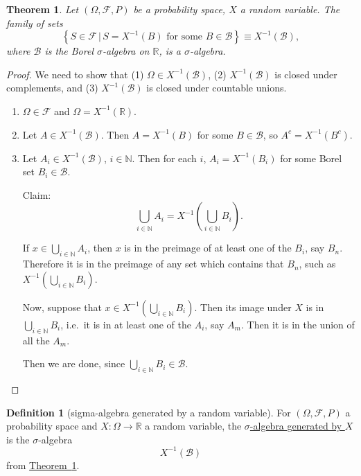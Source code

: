 \documentclass[a4paper,12pt]{scrreprt}
\newcommand{\R}{\mathbb{R}}
\newcommand{\N}{\mathbb{N}}
\newcommand{\defn}[1]{\ul{#1}}
\theoremstyle{definition}
\newtheorem{definition}{Definition}[section]
\theoremstyle{plain}
\newtheorem{theorem}{Theorem}[section]
\theoremstyle{remark}
\begin{document}
\begin{theorem}
  \label{thm:preimageofsigmaalgebraissigmaalgebra}
  Let $(\Omega, \mathcal{F}, P)$ be a probability space, $X$ a random variable. The family of sets
  \begin{equation*}
    \left\{ S \in \mathcal{F}\,\big|\, S = X^{-1}(B)\text{ for some }B \in \mathcal{B} \right\} \equiv X^{-1}(\mathcal{B}),
  \end{equation*}
  where $\mathcal{B}$ is the Borel $\sigma$-algebra on $\R$, is a $\sigma$-algebra.
\end{theorem}
\begin{proof}
  We need to show that (1) $\Omega \in X^{-1}(\mathcal{B})$, (2) $X^{-1}(\mathcal{B})$ is closed under complements, and (3) $X^{-1}(\mathcal{B})$ is closed under countable unions.
  \begin{enumerate}
    \item $\Omega \in \mathcal{F}$ and $\Omega = X^{-1}(\R)$.

    \item Let $A \in X^{-1}(\mathcal{B})$. Then $A = X^{-1}(B)$ for some $B \in \mathcal{B}$, so $A^{c} = X^{-1}(B^{c})$.

    \item Let $A_{i} \in X^{-1}(\mathcal{B})$, $i \in \N$. Then for each $i$, $A_{i} = X^{-1}(B_{i})$ for some Borel set $B_{i} \in \mathcal{B}$.

      Claim:
      \begin{equation*}
        \bigcup_{i \in \N} A_{i} = X^{-1}\left( \bigcup_{i \in \N} B_{i} \right).
      \end{equation*}

      If $x \in \bigcup_{i \in \N} A_{i}$, then $x$ is in the preimage of at least one of the $B_{i}$, say $B_{n}$. Therefore it is in the preimage of any set which contains that $B_{n}$, such as $X^{-1}\left( \bigcup_{i \in \N}B_{i} \right)$.

      Now, suppose that $x \in X^{-1}\left( \bigcup_{i \in \N} B_{i} \right)$. Then its image under $X$ is in $\bigcup_{i \in \N} B_{i}$, i.e.\ it is in at least one of the $A_{i}$, say $A_{m}$. Then it is in the union of all the $A_{m}$.

      Then we are done, since $\bigcup_{i \in \N} B_{i} \in \mathcal{B}$.
  \end{enumerate}
\end{proof}

\begin{definition}[sigma-algebra generated by a random variable]
  \label{def:sigmaalgebrageneratedbyarandomvariable}
  For $(\Omega, \mathcal{F}, P)$ a probability space and $X\colon \Omega \to \R$ a random variable, the \defn{$\sigma$-algebra generated by $X$} is the $\sigma$-algebra
  \begin{equation*}
    X^{-1}(\mathcal{B})
  \end{equation*}
  from \hyperref[thm:preimageofsigmaalgebraissigmaalgebra]{Theorem~\ref*{thm:preimageofsigmaalgebraissigmaalgebra}}.
\end{definition}
\end{document}

